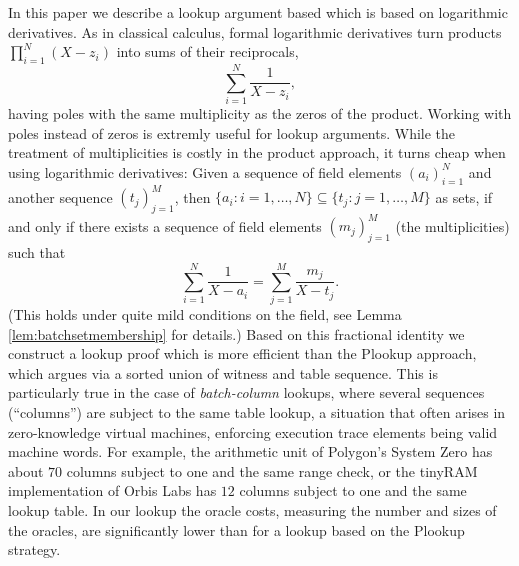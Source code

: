 \documentclass[11pt]{article}
\theoremstyle{definition}
\theoremstyle{definition}
\begin{document}
In this paper we describe a lookup argument based which is based on logarithmic derivatives. 
As in classical calculus, formal logarithmic derivatives turn products $\prod_{i=1}^N (X - z_i)$ into sums of their reciprocals, 
\[
\sum_{i=1}^N \frac{1}{X - z_i},
\]
having poles with the same multiplicity as the zeros of the product.
Working with poles instead of zeros is extremly useful for lookup arguments.
While the treatment of multiplicities is costly in the product approach, it turns cheap when using logarithmic derivatives:
Given a sequence of field elements $(a_i)_{i=1}^N$ and another sequence $(t_j)_{j=1}^M$, then $\{a_i: i =1,\ldots, N\}\subseteq \{t_j : j=1,\ldots, M\}$ as sets, if and only if there exists a sequence of field elements $(m_j)_{j=1}^M$ (the multiplicities) such that
\begin{equation*}
\label{e:intro:lookup:eq}
\sum_{i=1}^N \frac{1}{X - a_i}  = \sum_{j=1}^M \frac{m_j}{X - t_j}.
\end{equation*}
 (This holds under quite mild conditions on the field, see Lemma \ref{lem:batchsetmembership} for details.)
Based on this fractional identity we construct a lookup proof which is more efficient than the Plookup approach, which argues via a sorted union of witness and table sequence.
This is particularly true in the case of \textit{batch-column} lookups, where several sequences (``columns'') are subject to the same table lookup, a situation that often arises in zero-knowledge virtual machines,  enforcing execution trace elements being valid machine words.
For example, the arithmetic unit of Polygon's System Zero \cite{PolygonZero} has about $70$ columns subject to one and the same range check, or the tinyRAM implementation of Orbis Labs \cite{tinyRAMOrbis} has $12$ columns subject to one and the same lookup table. 
In our lookup the oracle costs, measuring the number and sizes of the oracles, are significantly lower than for a lookup based on the Plookup strategy.

\end{document}
